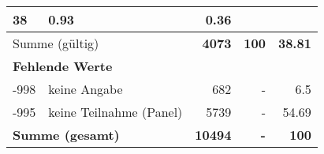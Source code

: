 \begin{longtable}{lXrrr}
       \num{38} &
       \num[round-mode=places,round-precision=2]{0,93} &
         \num[round-mode=places,round-precision=2]{0,36} \\
     \midrule
     \multicolumn{2}{l}{Summe (gültig)} &
       \textbf{\num{4073}} &
     \textbf{100} &
       \textbf{\num[round-mode=places,round-precision=2]{38,81}} \\
     \multicolumn{5}{l}{\textbf{Fehlende Werte}}\\
       -998 &
       keine Angabe &
         \num{682} &
        - &
         \num[round-mode=places,round-precision=2]{6,5} \\
       -995 &
       keine Teilnahme (Panel) &
         \num{5739} &
        - &
         \num[round-mode=places,round-precision=2]{54,69} \\
     \midrule
     \multicolumn{2}{l}{\textbf{Summe (gesamt)}} &
          \textbf{\num{10494}} &
        \textbf{-} &
        \textbf{100} \\
     \bottomrule
     \end{longtable}
     
